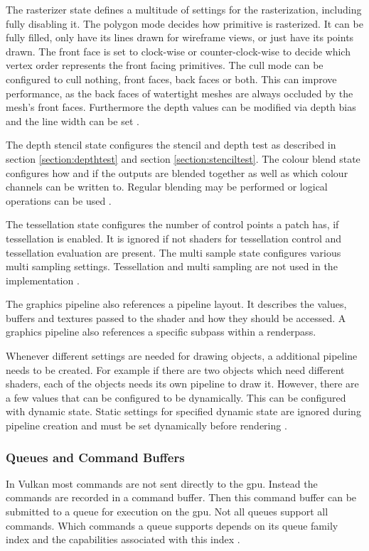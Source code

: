 The rasterizer state defines a multitude of settings for the rasterization, including fully disabling it. The polygon mode decides how primitive is rasterized. It can be fully filled, only have its lines drawn for wireframe views, or just have its points drawn. The front face is set to clock-wise or counter-clock-wise to decide which vertex order represents the front facing primitives. The cull mode can be configured to cull nothing, front faces, back faces or both. This can improve performance, as the back faces of watertight meshes are always occluded by the mesh's front faces. Furthermore the depth values can be modified via depth bias and the line width can be set \cite{khronos:vulkan:spec1.1}.

The depth stencil state configures the stencil and depth test as described in section \ref{section:depthtest} and section \ref{section:stenciltest}. The colour blend state configures how and if the outputs are blended together as well as which colour channels can be written to. Regular blending may be performed or logical operations can be used \cite{khronos:vulkan:spec1.1}.

The tessellation state configures the number of control points a patch has, if tessellation is enabled. It is ignored if not shaders for tessellation control and tessellation evaluation are present. The multi sample state configures various multi sampling settings. Tessellation and multi sampling are not used in the implementation \cite{khronos:vulkan:spec1.1}.

The graphics pipeline also references a pipeline layout. It describes the values, buffers and textures passed to the shader and how they should be accessed. A graphics pipeline also references a specific subpass within a renderpass\cite{khronos:vulkan:spec1.1}.

Whenever different settings are needed for drawing objects, a additional pipeline needs to be created. For example if there are two objects which need different shaders, each of the objects needs its own pipeline to draw it. However, there are a few values that can be configured to be dynamically. This can be configured with dynamic state. Static settings for specified dynamic state are ignored during pipeline creation and must be set dynamically before rendering \cite{khronos:vulkan:spec1.1}.

\subsubsection{Queues and Command Buffers}
In Vulkan most commands are not sent directly to the \gls{gpu}. Instead the commands are recorded in a command buffer. Then this command buffer can be submitted to a queue for execution on the \gls{gpu}. Not all queues support all commands. Which commands a queue supports depends on its queue family index and the capabilities associated with this index \cite{khronos:vulkan:spec1.1}.

